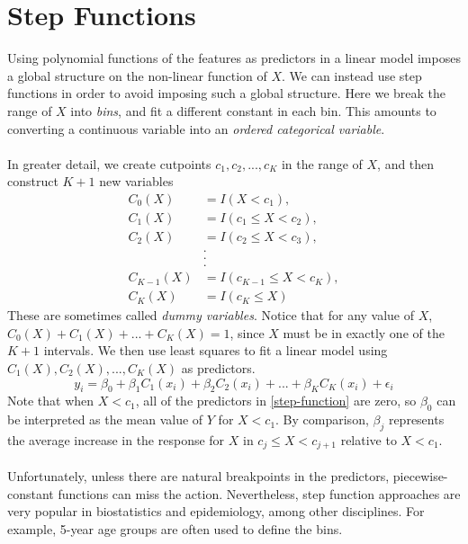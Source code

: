 \section{Step Functions}
Using polynomial functions of the features as predictors in a linear model imposes a global structure on the non-linear function of $X$. We can instead use step functions in order to avoid imposing such a global structure. Here we break the range of $X$ into \textit{bins}, and fit a different constant in each bin. This amounts to converting a continuous variable into an \textit{ordered categorical variable}.\\\\
In greater detail, we create cutpoints $c_1, c_2,...,c_K$ in the range of $X$, and then construct $K + 1$ new variables
\[
\begin{split}
    C_0(X) & = I(X<c_1),\\
    C_1(X) & = I(c_1 \leq X < c_2),\\
    C_2(X) & = I(c_2 \leq X < c_3),\\
    & .\\
    & .\\
    & .\\
    C_{K-1}(X) & = I(c_{K-1} \leq X < c_K),\\
    C_K(X) & = I(c_K \leq X)
\end{split}
\]
These are sometimes called \textit{dummy variables}. Notice that for any value of $X$, $C_0(X) + C_1(X) + ... + C_K(X) = 1$, since $X$ must be in exactly one of the $K + 1$ intervals. We then use least squares to fit a linear model using $C_1(X), C_2(X),...,C_K(X)$ as predictors.
\begin{equation}
    y_i = \beta_0 + \beta_1C_1(x_i) + \beta_2C_2(x_i) + ... + \beta_KC_K(x_i) + \epsilon_i
    \label{step-function}
\end{equation}
Note that when $X<c_1$, all of the predictors in \ref{step-function} are zero, so $\beta_0$ can be interpreted as the mean value of $Y$ for $X<c_1$. By comparison, $\beta_j$ represents the average increase in the response for $X$ in $c_j \leq X < c_{j+1}$ relative to $X<c_1$.
\\\\
Unfortunately, unless there are natural breakpoints in the predictors, piecewise-constant functions can miss the action.  Nevertheless, step function approaches are very popular in biostatistics and epidemiology, among other disciplines. For example, 5-year age groups are often used to define the bins.

